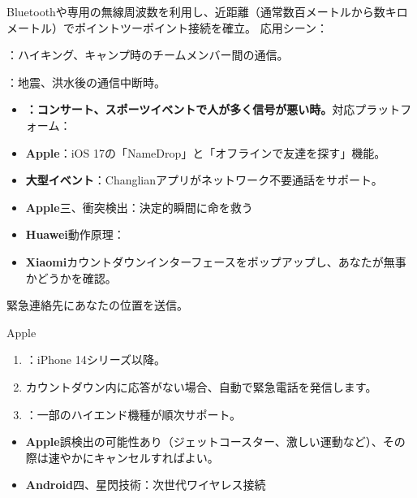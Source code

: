 \begin{tcbinfo}{Bluetoothや専用の無線周波数を利用し、近距離（通常数百メートルから数キロメートル）でポイントツーポイント接続を確立。}
応用シーン：

\end{tcbinfo}


：ハイキング、キャンプ時のチームメンバー間の通信。


：地震、洪水後の通信中断時。


\begin{itemize}
  \item \textbf{：コンサート、スポーツイベントで人が多く信号が悪い時。}対応プラットフォーム：
  \item \textbf{Apple}：iOS 17の「NameDrop」と「オフラインで友達を探す」機能。
  \item \textbf{大型イベント}：Changlianアプリがネットワーク不要通話をサポート。
\end{itemize}


\begin{itemize}
  \item \textbf{Apple}三、衝突検出：決定的瞬間に命を救う
  \item \textbf{Huawei}動作原理：
  \item \textbf{Xiaomi}カウントダウンインターフェースをポップアップし、あなたが無事かどうかを確認。
\end{itemize}


緊急連絡先にあなたの位置を送信。


Apple

\begin{enumerate}
  \item ：iPhone 14シリーズ以降。
  \item カウントダウン内に応答がない場合、自動で緊急電話を発信します。
  \item ：一部のハイエンド機種が順次サポート。
\end{enumerate}


\begin{itemize}
  \item \textbf{Apple}誤検出の可能性あり（ジェットコースター、激しい運動など）、その際は速やかにキャンセルすればよい。
  \item \textbf{Android}四、星閃技術：次世代ワイヤレス接続
\end{itemize}


